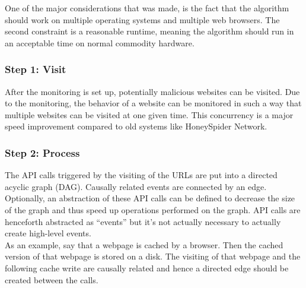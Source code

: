 One of the major considerations that was made, is the fact that the algorithm should work on multiple operating systems and multiple web browsers. The second constraint is a reasonable runtime, meaning the algorithm should run in an acceptable time on normal commodity hardware.

\subsubsection{Step 1: Visit}

After the monitoring is set up, potentially malicious websites can be visited. Due to the monitoring, the behavior of a website can be monitored in such a way that multiple websites can be visited at one given time. This concurrency is a major speed improvement compared to old systems like HoneySpider Network.


\subsubsection{Step 2: Process}

%

The API calls triggered by the visiting of the URLs are put into a directed acyclic graph (DAG). Causally related events are connected by an edge. Optionally, an abstraction of these API calls can be defined to decrease the size of the graph and thus speed up operations performed on the graph. API calls are henceforth abstracted as ``events'' but it's not actually necessary to actually create high-level events.\\


As an example, say that a webpage is cached by a browser. Then the cached version of that webpage is stored on a disk. The visiting of that webpage and the following cache write are causally related and hence a directed edge should be created between the calls.\\

